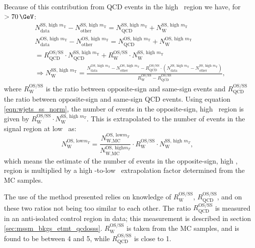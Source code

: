 Because of this contribution from QCD events in the high \mT~region we
have, for \mT~$>70\,\GeV$:
\begin{equation}\label{eqn:wjets_ss_norm}
\begin{split}
&N_{\text{data}}^{\text{SS, high } m_{\text{T}}} - N_{\text{other}}^{\text{SS,
 high } m_{\text{T}}}  =
N_{\text{QCD}}^{\text{SS, high } m_{\text{T}}} + N_{\text{W}}^{\text{SS, high } m_{\text{T}}} ~\\
&N_{\text{data}}^{\text{OS, high } m_{\text{T}}} - N_{\text{other}}^{\text{OS,
 high } m_{\text{T}}}  = N_{\text{QCD}}^{\text{OS, high } m_{\text{T}}} +
N_{\text{W}}^{\text{OS, high } m_{\text{T}}} \\
& = R_{\text{QCD}}^{\text{OS/SS}}\cdot N_{\text{QCD}}^{\text{SS, high } m_{\text{T}}} +
R_{\text{W}}^{\text{OS/SS}} \cdot N_{\text{W}}^{\text{SS, high } m_{\text{T}}} ~\\
&\Rightarrow N_{\text{W}}^{\text{SS, high } m_{\text{T}}}  = \frac{N_{\text{data}}^{\text{OS,
 high } m_{\text{T}}}  - N_{\text{other}}^{\text{OS, high } m_{\text{T}}}  -
R_{\text{QCD}}^{\text{OS/SS}}\cdot(N_{\text{data}}^{\text{SS, high } m_{\text{T}}}  -
N_{\text{other}}^{\text{SS, high } m_{\text{T}}} )}{R_{\text{W}}^{\text{OS/SS}} -
R_{\text{QCD}}^{\text{OS/SS}}} ,
\end{split}
\end{equation}
where $R_{\text{W}}^{\text{OS/SS}}$ is the ratio between opposite-sign and same-sign \Wjets events
and $R_{\text{QCD}}^{\text{OS/SS}}$ the ratio between opposite-sign and same-sign QCD events. Using 
equation \ref{eqn:wjets_ss_norm}, the number of \Wjets events in the
opposite-sign, high \mT~region is given by $R_{\text{W}}^{\text{OS/SS}}\cdot N_{\text{W}}^{\text{SS, high } m_{T}}$. 
This is extrapolated to the number of \Wjets events in the signal region at low \mT~as:
\begin{equation}\label{eqn:wjets_os_norm}
N_{\text{W}}^{\text{OS, low} m_{T}} = \frac{N_{\text{W,MC}}^{\text{OS, low} m_{T}}}{N_{\text{W,MC}}^{\text{OS, high} m_{T}}}\cdot R_{\text{W}}^{\text{OS/SS}} \cdot N_{\text{W}}^{\text{SS, high }m_{T}},
\end{equation}
which means the estimate of the number of \Wjets events in the opposite-sign, high \mT, region
is multiplied by a high \mT-to-low \mT~extrapolation factor determined from the \ac{MC} samples.

The use of the method presented relies on knowledge of $R_{\text{W}}^{\text{OS/SS}}$,
$R_{\text{QCD}}^{\text{OS/SS}}$, and on these two ratios not being too similar to each other. 
The ratio $R_{\text{QCD}}^{\text{OS/SS}}$ is measured in an anti-isolated
control region in data; this measurement is described in section \ref{sec:mssm_bkgs_etmt_qcdosss}. $R_{\text{W}}^{\text{OS/SS}}$ is 
taken from the \Wjets \ac{MC} samples, and is found to be between 4 and 5, while $R_{\text{QCD}}^{\text{OS/SS}}$
is close to 1.

